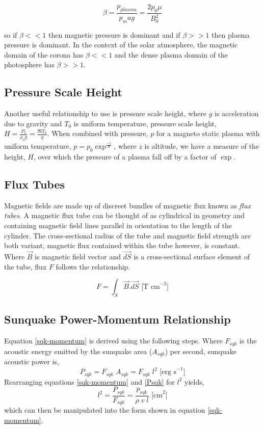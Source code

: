 \begin{equation}\label{beta}
\beta=\frac{p_{plasma}}{p_mag} = \frac{2p_{0}\mu}{B_{0}^2}
\end{equation}

so if $\beta << 1$ then magnetic pressure is dominant and if $\beta >> 1$ then plasma pressure is dominant. In the context of the solar atmosphere, the magnetic domain of the corona has $\beta << 1$ and the dense plasma domain of the photosphere has $\beta >> 1$.

\subsection{Pressure Scale Height}
Another useful relationship to use is pressure scale height, where $g$ is acceleration due to gravity and $T_0$ is uniform temperature, pressure scale height, $H=\frac{P_0}{\rho_{0}g} = \frac{\Re T_{0}}{g}$. When combined with pressure, $p$ for a magneto static plasma with uniform temperature, $p=p_{0}\exp^{\frac{-z}{H}}$, where $z$ is altitude, we have a measure of the height, $H$, over which the pressure of a plasma fall off by a factor of $\exp$. 

\subsection{Flux Tubes}
Magnetic fields are made up of discreet bundles of magnetic flux known as \emph{flux tubes}. A magnetic flux tube can be thought of as cylindrical in geometry and containing magnetic field lines parallel in orientation to the length of the cylinder. The cross-sectional radius of the tube and magnetic field strength are both variant, magnetic flux contained within the tube however, is constant. Where $\vec{B}$ is magnetic field vector and $\vec{dS}$ is a cross-sectional surface element of the tube, flux $F$ follows the relationship.

\begin{equation}\label{fluxtube}       
F = \int_{S} \vec{B}.\vec{dS} \text{ [T cm}^{-2}]
\end{equation}



\subsection{Sunquake Power-Momentum Relationship}\label{sqk-ptoP-relation}
Equation \ref{sqk-momentum} is derived using the following steps. Where $F_{sqk}$ is the acoustic energy emitted by the sunquake area ($A_{sqk}$) per second, sunquake acoustic power is, 
\begin{equation}
P_{sqk} = F_{sqk} \; A_{sqk} = F_{sqk} \; l^2 \text{ [erg s}^{-1}]
\end{equation}\label{Psqk}
Rearranging equations \ref{sqk-momentum} and \ref{Psqk} for $l^{2}$ yields,
\begin{equation}
l^2 = \frac{P_{sqk}}{F_{sqk}} = \frac{p_{sqk}}{\rho \; v \; l} \text{ [cm}^{2}]
\end{equation}\label{l^2}
which can then be manipulated into the form shown in equation \ref{sqk-momentum}. 



